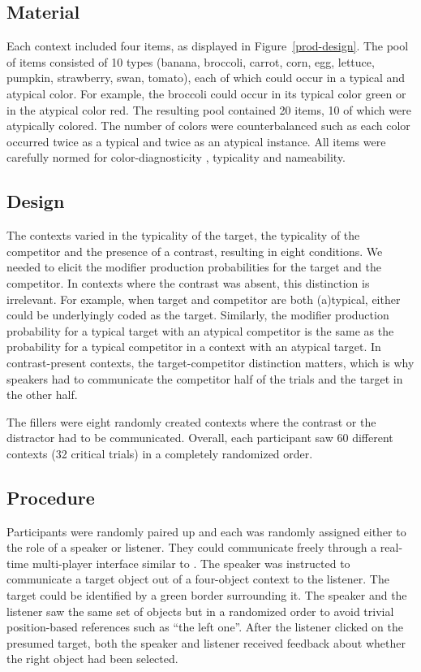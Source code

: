 \documentclass[10pt,letterpaper]{article}
\begin{document}
\subsection{Material} \label{Material}
Each context included four items, as displayed in Figure~\ref{prod-design}. The pool of items consisted of 10 types (banana, broccoli, carrot, corn, egg, lettuce, pumpkin, strawberry, swan, tomato), each of which could occur in a typical and atypical color. For example, the broccoli could occur in its typical color green or in the atypical color red. The resulting pool contained 20 items, 10 of which were atypically colored. The number of colors were counterbalanced such as each color occurred twice as a typical and twice as an atypical instance. All items were carefully normed for color-diagnosticity \cite{Tanaka:1999}, typicality and nameability.


\subsection{Design}
The contexts varied in the typicality of the target, the typicality of the competitor and the presence of a contrast, resulting in eight conditions. 
We needed to elicit the modifier production probabilities for the target and the competitor. In contexts where the contrast was absent, this distinction is irrelevant. For example, when target and competitor are both (a)typical, either could be underlyingly coded as the target. Similarly, the modifier production probability for a typical target with an atypical competitor is the same as the probability for a typical competitor in a context with an atypical target. In contrast-present contexts, the target-competitor distinction matters, which is why speakers had to communicate the competitor half of the trials and the target in the other half.

The fillers were eight randomly created contexts where the contrast or the distractor had to be communicated.
Overall, each participant saw 60 different contexts (32 critical trials) in a completely randomized order.


\subsection{Procedure}
Participants were randomly paired up and each was randomly assigned either to the role of a speaker or listener. They could communicate freely through a real-time multi-player interface similar to \cite{Hawkins:2015}. The speaker was instructed to communicate a target object out of a four-object context to the listener. The target could be identified by a green border surrounding it. The speaker and the listener saw the same set of objects but in a randomized order to avoid trivial position-based references such as ``the left one''. After the listener clicked on the presumed target, both the speaker and listener received feedback about whether the right object had been selected.
\end{document}
